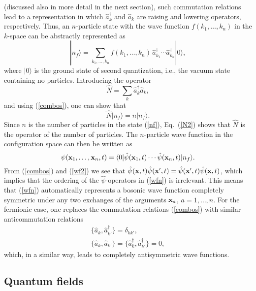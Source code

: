 \documentclass[12pt]{article}
\begin{document}
(discussed also in more detail in the next section),
such commutation relations lead to a representation in which
$\hat{a}_k^{\dagger}$ and $\hat{a}_k$ are raising and lowering operators,
respectively. Thus, an $n$-particle state with the 
wave function $f(k_1,\ldots,k_n)$ in the 
$k$-space can be abstractly represented as
\begin{equation}\label{nf}
|n_f\rangle =\sum_{k_1,\ldots,k_n} f(k_1,\ldots,k_n) \, 
\hat{a}^{\dagger}_{k_1} \cdots \hat{a}^{\dagger}_{k_n} |0\rangle ,
\end{equation}
where $|0\rangle$ is the ground state
of second quantization, i.e., the vacuum state 
containing no particles. 
Introducing the operator
\begin{equation}\label{N}
\hat{N}=\sum_{k} \hat{a}^{\dagger}_k \hat{a}_k ,
\end{equation}
and using (\ref{combos}), one can show that
\begin{equation}\label{N2}
\hat{N}|n_f\rangle = n |n_f\rangle .
\end{equation}
Since $n$ is the number of particles in the state (\ref{nf}),
Eq.~(\ref{N2}) shows that $\hat{N}$ is the operator of the 
number of particles.
The $n$-particle wave function 
in the configuration space can then be written as 
\begin{equation}\label{wfn}
\psi({\bf x}_1,\ldots,{\bf x}_n, t)=
\langle 0|\hat{\psi}({\bf x}_1,t)\cdots\hat{\psi}({\bf x}_n,t)|n_f\rangle .
\end{equation}
From (\ref{combos}) and (\ref{wf2}) we see that 
$\hat{\psi}({\bf x},t)\hat{\psi}({\bf x}',t)=
\hat{\psi}({\bf x}',t)\hat{\psi}({\bf x},t)$, which implies 
that the ordering of the $\hat{\psi}$-operators in (\ref{wfn}) is 
irrelevant. This means that (\ref{wfn}) automatically 
represents a bosonic wave function completely symmetric under 
any two exchanges of the arguments ${\bf x}_a$, $a=1,\ldots,n$.
For the fermionic case, one replaces the commutation relations
(\ref{combos}) with similar anticommutation relations  
\begin{eqnarray}\label{comfer}
& \{\hat{a}_k,\hat{a}_{k'}^{\dagger}\}=\delta_{kk'} , & \nonumber \\
& \{\hat{a}_k,\hat{a}_{k'}\}=
\{\hat{a}_k^{\dagger},\hat{a}_{k'}^{\dagger}\}=0 ,
\end{eqnarray}
which, in a similar way, leads to completely antisymmetric
wave functions.

\subsection{Quantum fields}
\end{document}
